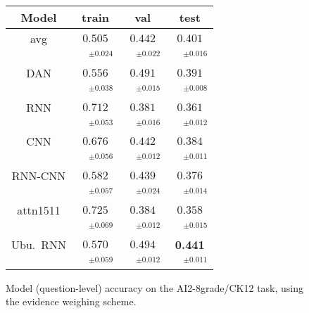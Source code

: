 \documentclass[11pt]{article}
\begin{document}
\begin{figure}[t]
\centering
\setlength{\tabcolsep}{3pt}
\begin{tabular}{|c|c|c|c|}
\hline
Model              & train & val & test \\
\hline
avg & $0.505$ & $0.442$ & $0.401$\\
 & $\quad^{\pm0.024}$ & $\quad^{\pm0.022}$ & $\quad^{\pm0.016}$\\
DAN & $0.556$ & $0.491$ & $0.391$\\
 & $\quad^{\pm0.038}$ & $\quad^{\pm0.015}$ & $\quad^{\pm0.008}$\\
\hline
RNN & $0.712$ & $0.381$ & $0.361$\\
 & $\quad^{\pm0.053}$ & $\quad^{\pm0.016}$ & $\quad^{\pm0.012}$\\
CNN & $0.676$ & $0.442$ & $0.384$\\
 & $\quad^{\pm0.056}$ & $\quad^{\pm0.012}$ & $\quad^{\pm0.011}$\\
RNN-CNN & $0.582$ & $0.439$ & $0.376$\\
 & $\quad^{\pm0.057}$ & $\quad^{\pm0.024}$ & $\quad^{\pm0.014}$\\
attn1511 & $0.725$ & $0.384$ & $0.358$\\
 & $\quad^{\pm0.069}$ & $\quad^{\pm0.012}$ & $\quad^{\pm0.015}$\\
Ubu.\ RNN & $0.570$ & $0.494$ & \textbf{0.441}\\
 & $\quad^{\pm0.059}$ & $\quad^{\pm0.012}$ & $\quad^{\pm0.011}$\\
\hline
\end{tabular}
\setlength{\tabcolsep}{6pt}
\vspace*{-0.2cm}
\caption{\footnotesize%
	Model (question-level) accuracy on the AI2-8grade/CK12 task, using the evidence weighing scheme.
}
\label{tab:ai2}
\end{figure}
\end{document}
